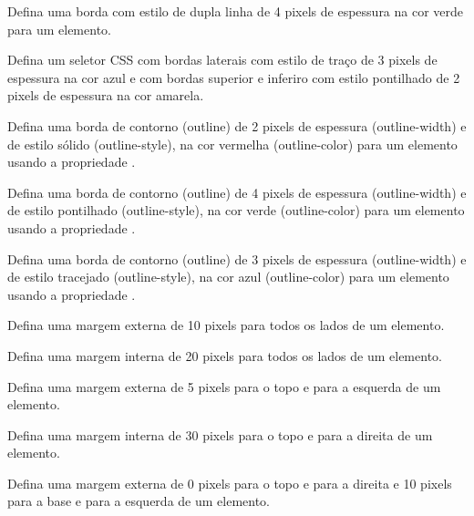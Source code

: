 \begin{exercise}
Defina uma borda com estilo de dupla linha de 4 pixels de espessura na cor verde para um elemento.
\end{exercise}

\begin{exercise}
Defina um seletor CSS com bordas laterais com estilo de traço de 3 pixels de espessura na cor azul e com bordas superior e inferiro com estilo pontilhado de 2 pixels de espessura na cor amarela.
\end{exercise}

\begin{exercise}
Defina uma borda de contorno (outline) de 2 pixels de espessura (outline-width) e de estilo sólido (outline-style), na cor vermelha (outline-color) para um elemento usando a propriedade .
\end{exercise}

\begin{exercise}
Defina uma borda de contorno (outline) de 4 pixels de espessura (outline-width) e de estilo pontilhado (outline-style), na cor verde (outline-color) para um elemento usando a propriedade .
\end{exercise}

\begin{exercise}
Defina uma borda de contorno (outline) de 3 pixels de espessura (outline-width) e de estilo tracejado (outline-style), na cor azul (outline-color) para um elemento usando a propriedade .
\end{exercise}

\begin{exercise}
Defina uma margem externa de 10 pixels para todos os lados de um elemento.
\end{exercise}

\begin{exercise}
Defina uma margem interna de 20 pixels para todos os lados de um elemento.
\end{exercise}

\begin{exercise}
Defina uma margem externa de 5 pixels para o topo e para a esquerda de um elemento.
\end{exercise}

\begin{exercise}
Defina uma margem interna de 30 pixels para o topo e para a direita de um elemento.
\end{exercise}

\begin{exercise}
Defina uma margem externa de 0 pixels para o topo e para a direita e 10 pixels para a base e para a esquerda de um elemento.
\end{exercise}

